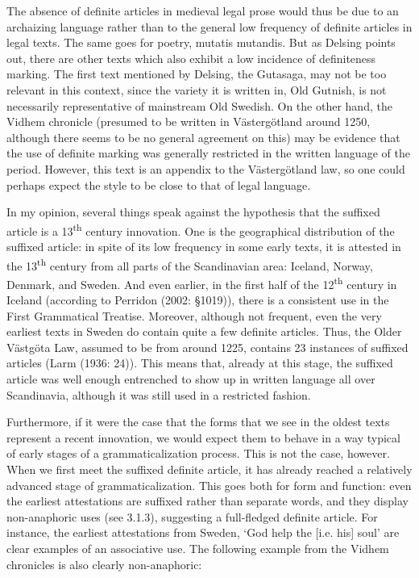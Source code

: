 The absence of definite articles in medieval legal prose would thus be due to an archaizing language rather than to the general low frequency of definite articles in legal texts. The same goes for poetry, mutatis mutandis. But as Delsing points out, there are other texts which also exhibit a low incidence of definiteness marking. The first text mentioned by Delsing, the Gutasaga, may not be too relevant in this context, since the variety it is written in, Old Gutnish, is not necessarily representative of mainstream Old Swedish.  On the other hand, the Vidhem chronicle (presumed to be written in Västergötland around 1250, although there seems to be no general agreement on this) may be evidence that the use of definite marking was generally restricted in the written language of the period. However, this text is an appendix to the Västergötland law, so one could perhaps expect the style to be close to that of legal language. 

In my opinion, several things speak against the hypothesis that the suffixed article is a 13\textsuperscript{th} century innovation. One is the geographical distribution of the suffixed article: in spite of its low frequency in some early texts, it is attested in the 13\textsuperscript{th} century from all parts of the Scandinavian area: Iceland, Norway, Denmark, and Sweden.  And even earlier, in the first half of the 12\textsuperscript{th} century in Iceland (according to Perridon (2002: §1019)), there is a consistent use in the First Grammatical Treatise. Moreover, although not frequent, even the very earliest texts in Sweden do contain quite a few definite articles. Thus, the Older Västgöta Law, assumed to be from around 1225, contains 23 instances of suffixed articles (Larm (1936: 24)). This means that, already at this stage, the suffixed article was well enough entrenched to show up in written language all over Scandinavia, although it was still used in a restricted fashion. 

Furthermore, if it were the case that the forms that we see in the oldest texts represent a recent innovation, we would expect them to behave in a way typical of early stages of a grammaticalization process. This is not the case, however. When we first meet the suffixed definite article, it has already reached a relatively advanced stage of grammaticalization. This goes both for form and function: even the earliest attestations are suffixed rather than separate words, and they display non-anaphoric uses (see 3.1.3), suggesting a full-fledged definite article. For instance, the earliest attestations from Sweden, ‘God help the [i.e. his] soul’ are clear examples of an associative use. The following example from the Vidhem chronicles is also clearly non-anaphoric:

